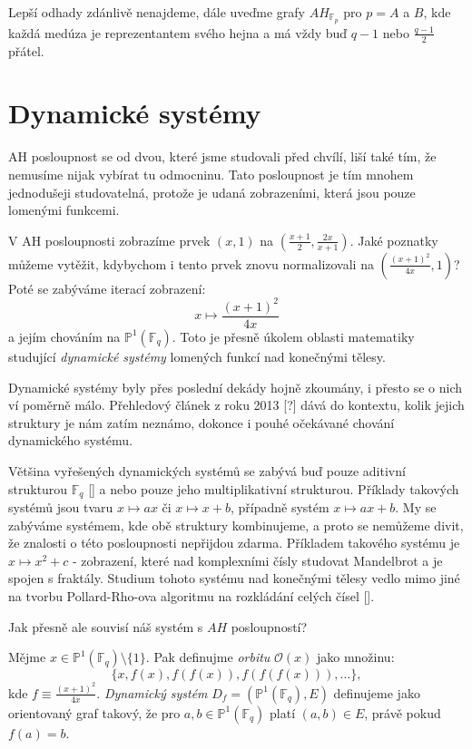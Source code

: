 \documentclass[12pt]{report}
\begin{document}
Lepší odhady zdánlivě nenajdeme, dále uveďme grafy $AH_{\mathbb{F}_p}$ pro $p = A$ a $B$, kde každá medúza je reprezentantem svého hejna a má vždy buď $q-1$ nebo $\frac{q-1}{2}$ přátel.

\section{Dynamické systémy}

AH posloupnost se od dvou, které jsme studovali před chvílí, liší také tím, že nemusíme nijak vybírat tu  odmocninu. Tato posloupnost je tím mnohem jednodušeji studovatelná, protože je udaná zobrazeními, která jsou pouze lomenými funkcemi. 
  
V AH posloupnosti zobrazíme prvek $(x,1)$ na $\left(\frac{x+1}{2}, \frac{2x}{x+1}\right)$. Jaké poznatky můžeme vytěžit, kdybychom i tento prvek znovu normalizovali na $\left ( \frac{(x+1)^2}{4x}, 1 \right)$? Poté se zabýváme iterací zobrazení:
$$x \longmapsto \frac{(x+1)^2}{4x}$$
a jejím chováním na $\mathbb{P}^1 ( \mathbb{F}_q)$. Toto je přesně úkolem oblasti matematiky studující \textit{dynamické systémy} lomených funkcí nad konečnými tělesy.

Dynamické systémy byly přes poslední dekády hojně zkoumány, i přesto se o nich ví poměrně málo. Přehledový článek z roku 2013 [?] dává do kontextu, kolik jejich struktury je nám zatím neznámo, dokonce i pouhé očekávané chování dynamického systému. 

Většina vyřešených dynamických systémů se zabývá buď pouze aditivní strukturou $\mathbb{F}_q$ [] a nebo pouze jeho multiplikativní strukturou. Příklady takových systémů jsou tvaru $x \longmapsto ax$ či $x \longmapsto x+b$, případně systém $x \longmapsto ax+b$. My se zabýváme systémem, kde obě struktury kombinujeme, a proto se nemůžeme divit, že znalosti o této posloupnosti nepřijdou zdarma. Příkladem takového systému je $x \longmapsto x^2+c$ - zobrazení, které nad komplexními čísly studovat Mandelbrot a je spojen s fraktály. Studium tohoto systému nad konečnými tělesy vedlo mimo jiné na tvorbu Pollard-Rho-ova algoritmu na rozkládání celých čísel [].

Jak přesně ale souvisí náš systém s $AH$ posloupností? 

\begin{definice}
Mějme $x \in \mathbb{P}^{1}(\mathbb{F}_q) \setminus \lbrace 1 \rbrace$. Pak definujme \textit{orbitu} $\mathcal{O}(x)$ jako množinu:
$$\lbrace x,f(x),f(f(x)),f(f(f(x))),\dots \rbrace,$$
kde $f \equiv \frac{(x+1)^2}{4x}$. \textit{Dynamický systém} $D_f = (\mathbb{P}^{1}(\mathbb{F}_q),E)$ definujeme jako orientovaný graf takový, že pro $a,b \in \mathbb{P}^{1}(\mathbb{F}_q)$ platí $(a,b) \in E$, právě pokud $f(a)=b$.
\end{definice}
\end{document}
